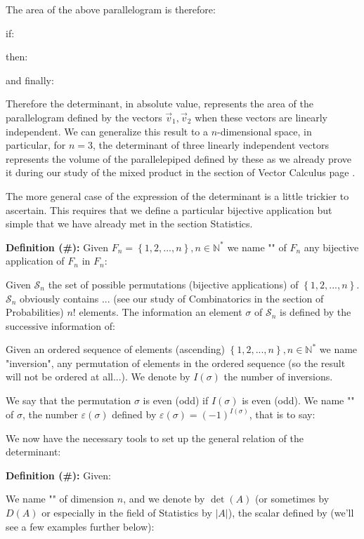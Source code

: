 	The area of the above parallelogram is therefore:
		
	if:
	
	then:
	
	and finally:
	
	Therefore the determinant, in absolute value, represents the area of the parallelogram defined by the vectors $\vec{v}_1,\vec{v}_2$ when these vectors are linearly independent. We can generalize this result to a $n$-dimensional space, in particular, for $n=3$, the determinant of three linearly independent vectors represents the volume of the parallelepiped defined by these as we already prove it during our study of the mixed product in the section of Vector Calculus page \pageref{mixed product}.
	
	The more general case of the expression of the determinant is a little trickier to ascertain. This requires that we define a particular bijective application but simple that we have already met in the section Statistics.
	
	\textbf{Definition (\#\mydef):} Given $F_n=\left\lbrace 1,2,...,n\right\rbrace,n\in \mathbb{N}^{*}$ we name "" of $F_n$ any bijective application of $F_n$ in $F_n$:
	
	Given $\mathcal{S}_n$ the set of possible permutations (bijective applications) of $\left\lbrace 1,2,...,n\right\rbrace$.  $\mathcal{S}_n$ obviously contains ... (see our study of Combinatorics in the section of Probabilities) $n!$ elements. The information an element $\sigma$ of $\mathcal{S}_n$ is defined by the successive information of:
	
	Given an ordered sequence of elements (ascending) $\left\lbrace 1,2,...,n\right\rbrace,n \in \mathbb{N}^{*}$ we name "inversion", any permutation of elements in the ordered sequence (so the result will not be ordered at all...). We denote by $I(\sigma)$ the number of inversions.
	
	We say that the permutation $\sigma$ is even (odd) if $I(\sigma)$ is even (odd). We name "" of $\sigma$, the number $\varepsilon(\sigma)$ defined by $\varepsilon(\sigma)=(-1)^{I(\sigma)}$, that is to say:
	
	We now have the necessary tools to set up the general relation of the determinant:
	
	\textbf{Definition (\#\mydef):} Given:
	
	We name "" of dimension $n$, and we denote by $\det (A)$ (or sometimes by $D(A)$ or especially in the field of Statistics by $|A|$), the scalar defined by (we'll see a few examples further below):
	
